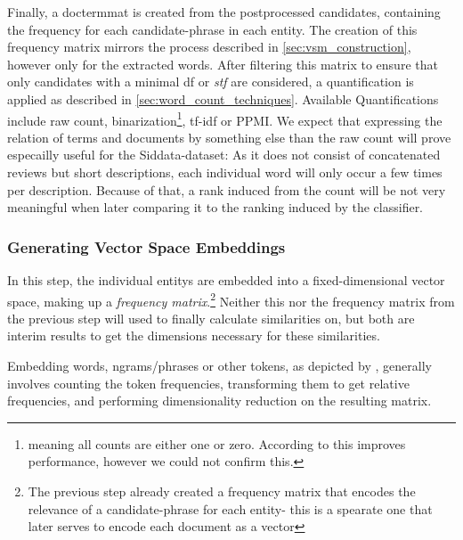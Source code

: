 Finally, a \gls{doctermmat} is created from the postprocessed candidates, containing the frequency for each candidate-phrase in each entity. The creation of this frequency matrix mirrors the process described in \autoref{sec:vsm_construction}, however only for the extracted words. After filtering this matrix to ensure that only candidates with a minimal \gls{df} or \textit{stf} are considered, a quantification is applied as described in \autoref{sec:word_count_techniques}. Available Quantifications include raw count, binarization\footnote{meaning all counts are either one or zero. According to \textcite{Alshaikh2020} this improves performance, however we could not confirm this.}, tf-idf or PPMI. We expect that expressing the relation of terms and documents by something else than the raw count will prove especailly useful for the Siddata-dataset: As it does not consist of concatenated reviews but short descriptions, each individual word will only occur a few times per description. Because of that, a \gls{rank} induced from the count will be not very meaningful when later comparing it to the ranking induced by the classifier.

\subsubsection{Generating Vector Space Embeddings}
\label{sec:generate_vectorspaces}

In this step, the individual \glspl{entity} are embedded into a fixed-dimensional vector space, making up a \emph{frequency matrix}.\footnote{The previous step already created a frequency matrix that encodes the relevance of a candidate-phrase for each entity- this is a spearate one that later serves to encode each document as a vector} Neither this nor the frequency matrix from the previous step will used to finally calculate similarities on, but both are interim results to get the dimensions necessary for these similarities.


Embedding words, \glspl{ngram}/phrases or other tokens, as depicted by \cite{Turney2010,Lowe}, generally involves counting the token frequencies, transforming them to get relative frequencies, and performing dimensionality reduction on the resulting matrix.

